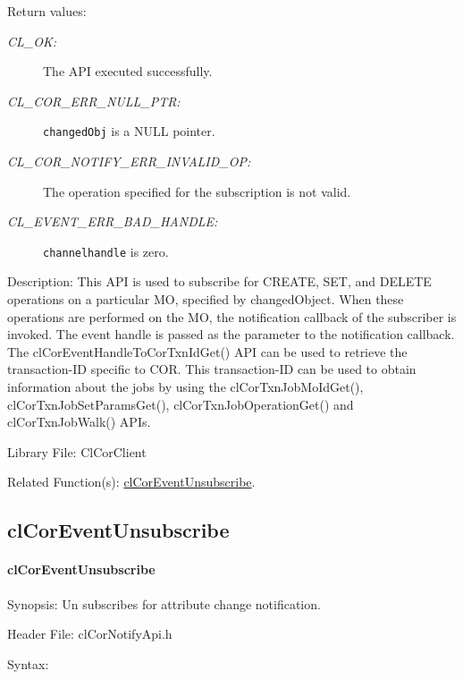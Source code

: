 \begin{flushleft}
\begin{Desc}
\begin{description}
\end{description}
\end{Desc}
\begin{Desc}
\item[Return values:]
\begin{description}
\item[{\em CL\_\-OK:}]The API executed successfully. 
\item[{\em CL\_\-COR\_\-ERR\_\-NULL\_\-PTR:}]{\tt{changedObj}} is a NULL pointer. 
\item[{\em CL\_\-COR\_\-NOTIFY\_\-ERR\_\-INVALID\_\-OP:}] The operation specified for the subscription is not valid.
\item[{\em CL\_\-EVENT\_\-ERR\_\-BAD\_\-HANDLE:}] {\tt{channelhandle}} is zero.
\end{description}
\end{Desc}
\begin{Desc}
\item[Description:] This API is used to subscribe for CREATE, SET, and DELETE operations on a particular MO, specified by changedObject. When these 
operations are performed on the MO, the notification callback of the subscriber is invoked. The event handle
is passed as the parameter to the notification callback. The clCorEventHandleToCorTxnIdGet() API can be used to retrieve the  transaction-ID specific to
COR. This transaction-ID can be used to obtain information about the jobs by using the clCorTxnJobMoIdGet(), clCorTxnJobSetParamsGet(), 
clCorTxnJobOperationGet() and clCorTxnJobWalk() APIs.
\end{Desc}
\begin{Desc}
\item[Library File:]Cl\-Cor\-Client\end{Desc}
\begin{Desc}
\item[Related Function(s):]\hyperlink{pagecor134}{cl\-Cor\-Event\-Unsubscribe}. \end{Desc}
\newpage


\subsection{clCorEventUnsubscribe}
\hypertarget{pagecor134}{}\paragraph{cl\-Cor\-Event\-Unsubscribe}\label{pagecor134}
\begin{Desc}
\item[Synopsis:]Un subscribes for attribute change notification.\end{Desc}
\begin{Desc}
\item[Header File:]clCorNotifyApi.h\end{Desc}
\begin{Desc}
\item[Syntax:]


\end{Desc}
\end{flushleft}
